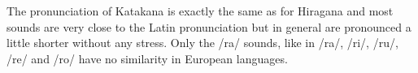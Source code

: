 \bigskip
The pronunciation of Katakana is exactly the same as for Hiragana and most
sounds are very close to the Latin pronunciation but in general are pronounced a
little shorter without any stress. Only the /ra/ sounds, like in /ra/, /ri/, /ru/,
/re/ and /ro/ have no similarity in European languages. 




